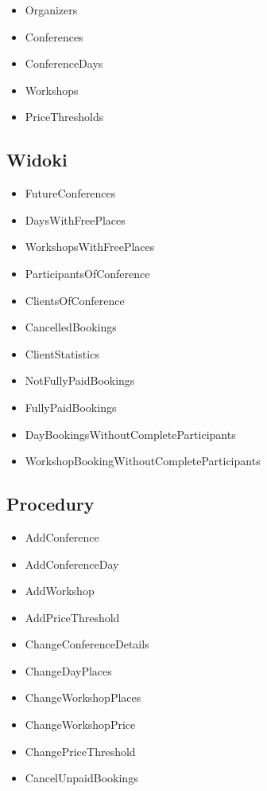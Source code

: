\documentclass[12pt, a4paper]{mwrep}
\begin{document}
\begin{itemize}
  \item Organizers
  \item Conferences
  \item ConferenceDays
  \item Workshops
  \item PriceThresholds
\end{itemize}

\subsection{Widoki}

\begin{itemize}
  \item FutureConferences
  \item DaysWithFreePlaces
  \item WorkshopsWithFreePlaces
  \item ParticipantsOfConference
  \item ClientsOfConference
  \item CancelledBookings
  \item ClientStatistics
  \item NotFullyPaidBookings
  \item FullyPaidBookings
  \item DayBookingsWithoutCompleteParticipants
  \item WorkshopBookingWithoutCompleteParticipants
\end{itemize}

\subsection{Procedury}

\begin{itemize}
  \item AddConference
  \item AddConferenceDay
  \item AddWorkshop
  \item AddPriceThreshold
  \item ChangeConferenceDetails
  \item ChangeDayPlaces
  \item ChangeWorkshopPlaces
  \item ChangeWorkshopPrice
  \item ChangePriceThreshold
  \item CancelUnpaidBookings
\end{itemize}
\end{document}
